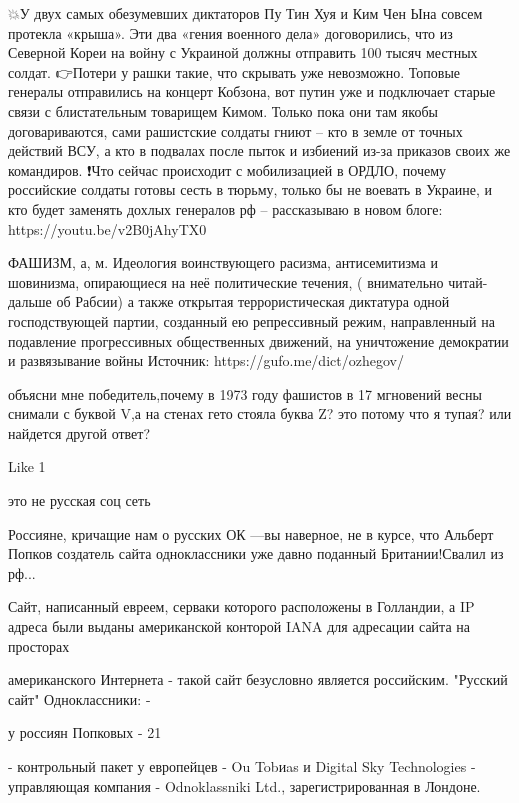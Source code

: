 {%
💥У двух самых обезумевших диктаторов Пу Тин Хуя и Ким Чен Ына совсем протекла «крыша». Эти два «гения военного дела» договорились, что из Северной Кореи на войну с Украиной должны отправить 100 тысяч местных солдат.
👉Потери у рашки такие, что скрывать уже невозможно. Топовые генералы отправились на концерт Кобзона, вот путин уже и подключает старые связи с блистательным товарищем Кимом. Только пока они там якобы договариваются, сами рашистские солдаты гниют – кто в земле от точных действий ВСУ, а кто в подвалах после пыток и избиений из-за приказов своих же командиров.
❗️Что сейчас происходит с мобилизацией в ОРДЛО, почему российские солдаты готовы сесть в тюрьму, только бы не воевать в Украине, и кто будет заменять дохлых генералов рф – рассказываю в новом блоге: https://youtu.be/v2B0jAhyTX0


ФАШИЗМ, а, м. Идеология воинствующего расизма, антисемитизма и шовинизма, опирающиеся на неё политические течения,
( внимательно читай- дальше об Рабсии)
а также открытая террористическая диктатура одной господствующей партии, созданный ею репрессивный режим, направленный на подавление прогрессивных общественных движений, на уничтожение демократии и развязывание войны
Источник: https://gufo.me/dict/ozhegov/%


объясни мне победитель,почему в 1973 году фашистов в 17 мгновений весны снимали
с буквой V,а на стенах гето стояла буква Z? это потому что я тупая? или
найдется другой ответ?

    Like 1

это не русская соц сеть

Россияне, кричащие нам о русских ОК —вы наверное, не в курсе, что Альберт Попков создатель сайта одноклассники уже давно поданный Британии!Свалил из рф... 

Сайт, написанный евреем, серваки которого расположены в Голландии, а IP адреса были выданы американской конторой IANA для адресации сайта на просторах 

американского Интернета - такой сайт безусловно является российским. "Русский сайт" Одноклассники: - 

у россиян Попковых - 21%

 - контрольный пакет у европейцев - Ou Tobиas и Digital Sky Technologies - управляющая компания - Odnoklassniki Ltd., зарегистрированная в Лондоне. 

}
